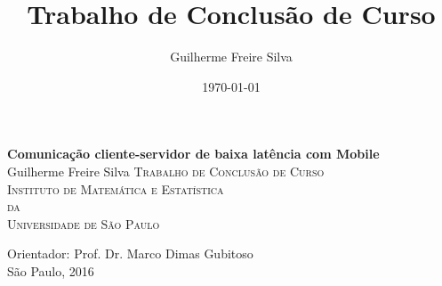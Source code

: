 \documentclass[a4paper,12pt]{article}
\title{Trabalho de Conclusão de Curso}
\author{Guilherme Freire Silva}
\date{\today}
\begin{document}

\thispagestyle{empty}
\begin{center}
    \vspace*{2.3cm}
    \textbf{\Large{Comunicação cliente-servidor de baixa latência com Mobile}}\\


    \vspace*{1.2cm}
    \Large{
        Guilherme Freire Silva
    }
    \vskip 2cm
    \textsc{
     Trabalho de Conclusão de Curso \\[-0.25cm]
    Instituto de Matemática e Estatística\\[-0.25cm]
    da\\[-0.25cm]
    Universidade de São Paulo\\[-0.25cm]%
    }

    \vskip 2.5cm
    Orientador: Prof. Dr. Marco Dimas Gubitoso\\

    \vskip 3.5cm
    \normalsize{São Paulo, 2016}
\end{center}

\newpage
% 

\newpage
\listoffigures
\listoftables
\tableofcontents

% 

\newpage %

\renewcommand{\arraystretch}{1.2}

% 
% 
% 
% 
% 
% 
% 
% 

\end{document}
